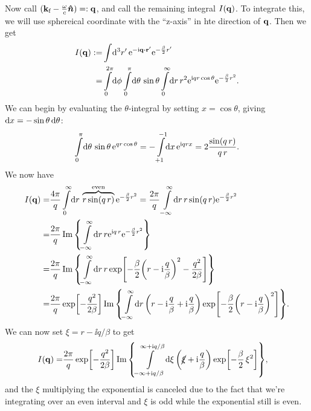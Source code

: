 \documentclass[11pt,letter, swedish, english
]{article}
\begin{document}
Now call $(\vb{k}_{\text{f}}-\frac{\omega}{c}\vu*{n})=:\vb{q}$, and call the remaining
integral $I(\vb{q})$.
To integrate this, we will use sphereical coordinate with the
``z-axis'' in hte direction of $\vb{q}$. Then we get
\begin{equation}
\begin{aligned}
I(\vq):=&\int\!\rd^3r'\,
\ee^{-\ii\vq\vdot\vb{r}'}
\ee^{-\frac{\beta}{2}r'}\\
=&\int_0^{2\pi}\!\rd\phi\int_0^\pi\!\rd\theta\,\sin\theta
\int_0^\infty\!\rd{r}\,r^2\ee^{\ii q r\cos\theta}\ee^{-\frac{\beta}{2}r^2}.
\end{aligned}
\end{equation}
We can begin by evaluating the $\theta$-integral by setting
$x=\cos\theta$, giving $\mathrm{d}{x}=-\sin\theta\,\mathrm{d}\theta$:
\begin{equation}\label{eq:2_theta_int}
\int_0^\pi\!\rd\theta\,\sin\theta\,\ee^{q r\cos\theta}
=-\int_{+1}^{-1}\!\rd{x}\,\ee^{\ii q rx}
=2\frac{\sin(q\,r)}{q\,r}.
\end{equation}
We now have
\begin{equation}
\begin{aligned}
I(\vq)=&\frac{4\pi}{q} \int_0^\infty\!\rd{r}\,
\overbrace{r\sin(q\,r)}^{\text{even}}
\ee^{-\frac{\beta}{2}r^2}=\frac{2\pi}{q} \int_{-\infty}^\infty\!\rd{r}\,
r\sin(q\,r)\ee^{-\frac{\beta}{2}r^2}\\
=&\frac{2\pi}{q} \Im\qty{
\int_{-\infty}^\infty\!\rd{r}\,
r\ee^{\ii q\,r}\ee^{-\frac{\beta}{2}r^2}}\\
=&\frac{2\pi}{q} \Im\qty{
\int_{-\infty}^\infty\!\rd{r}\,
r\exp[-\frac{\beta}{2}\qty(r-\ii\frac{q}{\beta})^2
-\frac{q^2}{2\beta}] }\\
=&\frac{2\pi}{q}\exp[-\frac{q^2}{2\beta}]
\Im\qty{\int_{-\infty}^\infty\!\rd{r}\,
\qty(r-\ii\frac{q}{\beta}+\ii\frac{q}{\beta})
\exp[-\frac{\beta}{2}\qty(r-\ii\frac{q}{\beta})^2]}.
\end{aligned}
\end{equation}
We can now set $\xi=r-\ii q/\beta$ to get
\begin{equation}\label{eq:2_comlex_integral}
\begin{aligned}
I(\vq)=&\frac{2\pi}{q}\exp[-\frac{q^2}{2\beta}]
\Im\qty{\int_{-\infty+\ii q/\beta}^{\infty+\ii q/\beta}\!\rd{\xi}\,
\qty(\cancel{\xi}+\ii\frac{q}{\beta})
\exp[-\frac{\beta}{2}\,\xi^2]},
\end{aligned}
\end{equation}
and the $\xi$ multiplying the exponential is canceled due to the fact
that we're integrating over an even interval and $\xi$ is odd while
the exponential still is even. 
\end{document}
